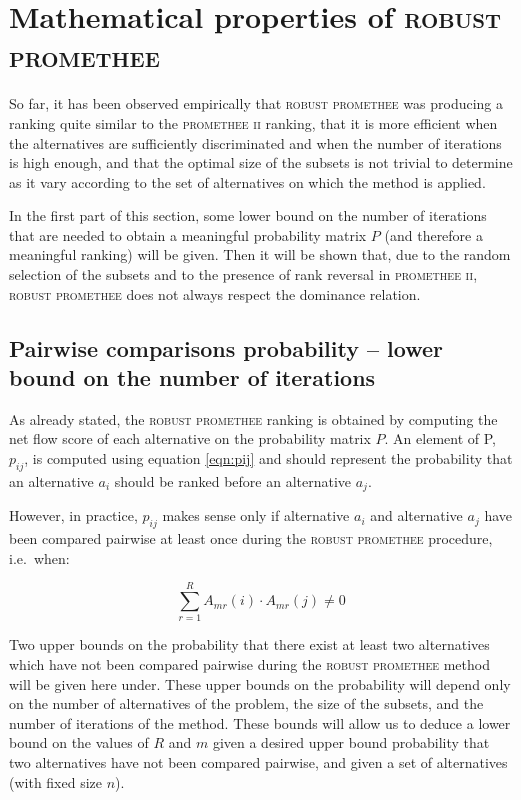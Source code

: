 \section{Mathematical properties of \textsc{robust promethee}}

So far, it has been observed empirically that \textsc{robust promethee} was producing a ranking quite similar to the \textsc{promethee ii} ranking, that it is more efficient when the alternatives are sufficiently discriminated and when the number of iterations is high enough, and that the optimal size of the subsets is not trivial to determine as it vary according to the set of alternatives on which the method is applied.

In the first part of this section, some lower bound on the number of iterations that are needed to obtain a meaningful probability matrix $P$ (and therefore a meaningful ranking) will be given.
Then it will be shown that, due to the random selection of the subsets and to the presence of rank reversal in \textsc{promethee ii}, \textsc{robust promethee} does not always respect the dominance relation.

\subsection{Pairwise comparisons probability -- lower bound on the number of iterations}

As already stated, the \textsc{robust promethee} ranking is obtained by computing the net flow score of each alternative on the probability matrix $P$.
An element of P, $p_{ij}$, is computed using equation \ref{eqn:pij} and should represent the probability that an alternative $a_i$ should be ranked before an alternative $a_j$.

However, in practice, $p_{ij}$ makes sense only if alternative $a_{i}$ and alternative $a_j$ have been compared pairwise at least once during the \textsc{robust promethee} procedure, i.e.\ when:

\begin{equation}
    \sum\limits_{r=1}^R A_{mr}(i)\cdot A_{mr}(j) \ne 0
    \label{eqn:pij_sens_condition}
\end{equation}

Two upper bounds on the probability that there exist at least two alternatives which have not been compared pairwise during the \textsc{robust promethee} method will be given here under.
These upper bounds on the probability will depend only on the number of alternatives of the problem, the size of the subsets, and the number of iterations of the method.
These bounds will allow us to deduce a lower bound on the values of $R$ and $m$ given a desired upper bound probability that two alternatives have not been compared pairwise, and given a set of alternatives (with fixed size $n$).\\

